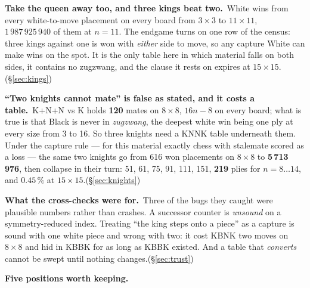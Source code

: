 \documentclass[10pt]{article}
\begin{document}
\smallskip
\noindent\textbf{Take the queen away too, and three kings beat two.}\ White
wins from every white-to-move placement on every board from $3\times3$ to
$11\times11$, $1\,987\,925\,940$ of them at $n=11$. The endgame turns on one
row of the census: three kings against one is won with \emph{either} side to
move, so any capture White can make wins on the spot. It is the only table here
in which material falls on both sides, it contains no zugzwang, and the clause
it rests on expires at $15\times15$.\hfill(\S\ref{sec:kings})

\smallskip
\noindent\textbf{``Two knights cannot mate'' is false as stated, and it costs a
table.}\ K+N+N vs K holds \textbf{120} mates on $8\times8$, $16n-8$ on every
board; what is true is that Black is never in \emph{zugzwang}, the deepest
white win being one ply at every size from 3 to 16. So three knights need a
KNNK table underneath them. Under the capture rule --- for this material
exactly chess with stalemate scored as a loss --- the same two knights go from
616 won placements on $8\times8$ to \textbf{5\,713\,976}, then collapse in
their turn: 51, 61, 75, 91, 111, 151, \textbf{219} plies for $n=8\ldots14$, and
$0.45\,\%$ at $15\times15$.\hfill(\S\ref{sec:knights})

\smallskip
\noindent\textbf{What the cross-checks were for.}\ Three of the bugs they
caught were plausible numbers rather than crashes. A successor counter is
\emph{unsound} on a symmetry-reduced index. Treating ``the king steps onto a
piece'' as a capture is sound with one white piece and wrong with two: it cost
KBNK two moves on $8\times8$ and hid in KBBK for as long as KBBK existed. And a
table that \emph{converts} cannot be swept until nothing
changes.\hfill(\S\ref{sec:trust})

\normalsize
\vspace{3mm}
\noindent\textbf{Five positions worth keeping.}

\medskip
\noindent
{}
\hfill
{}\hfill
{}\hfill
{}\hfill
{}
\end{document}
